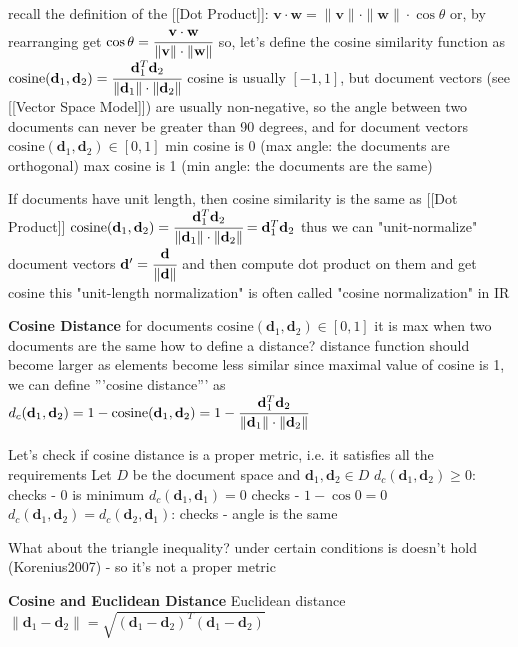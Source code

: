 recall the definition of the [[Dot Product]]: $\mathbf v \cdot \mathbf w = \| \mathbf v \| \cdot \| \mathbf w \| \cdot \cos \theta$
or, by rearranging get $\cos \theta = \cfrac{\mathbf v \cdot \mathbf w}{\| \mathbf v \| \cdot \| \mathbf w \|}$
so, let's define the cosine similarity function as $\text{cosine}(\mathbf d_1, \mathbf d_2) = \cfrac{\mathbf d_1^T \mathbf d_2}{\| \mathbf d_1 \| \cdot \| \mathbf d_2 \|}$
cosine is usually $[-1, 1]$, but document vectors (see [[Vector Space Model]]) are usually non-negative, so the angle between two documents can never be greater than 90 degrees, and for document vectors $\text{cosine}(\mathbf d_1, \mathbf d_2) \in [0, 1]$
min cosine is 0 (max angle: the documents are orthogonal)
max cosine is 1 (min angle: the documents are the same)


If documents have unit length, then cosine similarity is the same as [[Dot Product]]
$\text{cosine}(\mathbf d_1, \mathbf d_2) = \cfrac{\mathbf d_1^T \mathbf d_2}{\| \mathbf d_1 \| \cdot \| \mathbf d_2 \|} = \mathbf d_1^T \mathbf d_2$
thus we can "unit-normalize" document vectors $\mathbf d' = \cfrac{\mathbf d}{\| \mathbf d \|}$ and then compute dot product on them and get cosine
 this "unit-length normalization" is often called "cosine normalization" in IR



\textbf{ Cosine Distance}
for documents $\text{cosine}(\mathbf d_1, \mathbf d_2) \in [0, 1]$
it is max when two documents are the same
how to define a distance? distance function should become larger as elements become less similar
since maximal value of cosine is 1, we can define '''cosine distance''' as
$d_c(\mathbf d_1, \mathbf d_2) = 1 - \text{cosine}(\mathbf d_1, \mathbf d_2) = 1 -  \cfrac{\mathbf d_1^T \mathbf d_2}{\| \mathbf d_1 \| \cdot \| \mathbf d_2 \|}$


Let's check if cosine distance is a proper metric, i.e. it satisfies all the requirements
Let $D$ be the document space and $\mathbf d_1, \mathbf d_2 \in D$
 $d_c(\mathbf d_1, \mathbf d_2) \geqslant 0$: checks - 0 is minimum
$d_c(\mathbf d_1, \mathbf d_1) = 0$ checks - $1 - \cos 0 = 0$
 $d_c(\mathbf d_1, \mathbf d_2) = d_c(\mathbf d_2, \mathbf d_1)$: checks - angle is the same


What about the triangle inequality?
under certain conditions is doesn't hold (Korenius2007) - so it's not a proper metric



\textbf{Cosine and Euclidean Distance}
Euclidean distance $\| \mathbf d_1 - \mathbf d_2 \| = \sqrt{(\mathbf d_1 - \mathbf d_2)^T (\mathbf d_1 - \mathbf d_2)}$


